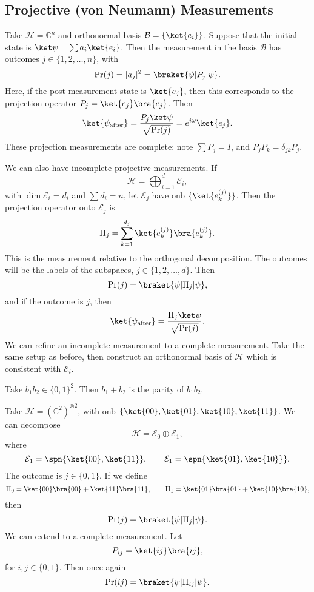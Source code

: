 \documentclass[12pt]{article}
\begin{document}
\subsection{Projective (von Neumann) Measurements}
\label{sub:proj_m}

Take $\mathcal{H} = \mathbb{C}^n$ and orthonormal basis $\mathcal{B} = \{\ket{e_i}\}$. Suppose that the initial state is $\ket \psi = \sum a_i \ket{e_i}$. Then the measurement in the basis $\mathcal{B}$ has outcomes $j \in \{1, 2, \ldots, n\}$, with
\[
	\Pr(j) = |a_j|^2 = \braket{\psi|P_j|\psi}.
\]
Here, if the post measurement state is $\ket{e_j}$, then this corresponds to the projection operator $P_j = \ket{e_j} \bra{e_j}$. Then
\[
	\ket{\psi_{\mathrm{after}}} = \frac{P_j \ket \psi}{\sqrt{\Pr(j)}} = e^{i \omega} \ket{e_j}.
\]
These projection measurements are complete: note $\sum P_j = I$, and $P_j P_k = \delta_{jk} P_j$.

We can also have incomplete projective measurements. If
\[
\mathcal{H} = \bigoplus_{i = 1}^d \mathcal{E}_i,
\]
with $\dim \mathcal{E}_i = d_i$ and $\sum d_i = n$, let $\mathcal{E}_j$ have onb $\{\ket{e_k^{(j)}}\}$. Then the projection operator onto $\mathcal{E}_j$ is
\[
	\Pi_j = \sum_{k = 1}^{d_j} \ket{e_k^{(j)}}\bra{e_k^{(j)}}.
\]
This is the measurement relative to the orthogonal decomposition. The outcomes will be the labels of the subspaces, $j \in \{1, 2, \ldots, d\}$. Then
\[
	\Pr(j) = \braket{\psi|\Pi_j|\psi},
\]
and if the outcome is $j$, then
\[
	\ket{\psi_{\mathrm{after}}} = \frac{\Pi_j \ket \psi}{\sqrt{\Pr(j)}}.
\]
We can refine an incomplete measurement to a complete measurement. Take the same setup as before, then construct an orthonormal basis of $\mathcal{H}$ which is consistent with $\mathcal{E}_i$.

\begin{exbox}
	Take $b_1b_2\in \{0, 1\}^2$. Then $b_1 + b_2$ is the parity of $b_1b_2$.

	Take $\mathcal{H} = (\mathbb{C}^2)^{\otimes 2}$, with onb $\{\ket{00}, \ket{01}, \ket{10}, \ket{11}\}$. We can decompose
	\[
	\mathcal{H} = \mathcal{E}_0 \oplus \mathcal{E}_1,
	\]
	where
	\[
	\mathcal{E}_1 = \spn\{\ket{00}, \ket{11}\}, \qquad \mathcal{E}_1 = \spn{\ket{01}, \ket{10}\}}.
	\]
	The outcome is $j \in \{0, 1\}$. If we define
	\[
		\Pi_0 = \ket{00}\bra{00} + \ket{11}\bra{11}, \qquad \Pi_1 = \ket{01}\bra{01} + \ket{10}\bra{10},
	\]
	then
	\[
		\Pr(j) = \braket{\psi|\Pi_j|\psi}.
	\]
	We can extend to a complete measurement. Let
	\[
		P_{ij} = \ket{ij}\bra{ij},
	\]
	for $i, j \in \{0, 1\}$. Then once again
	\[
		\Pr(ij) = \braket{\psi|\Pi_{ij}|\psi}.
	\]
\end{exbox}
\end{document}
